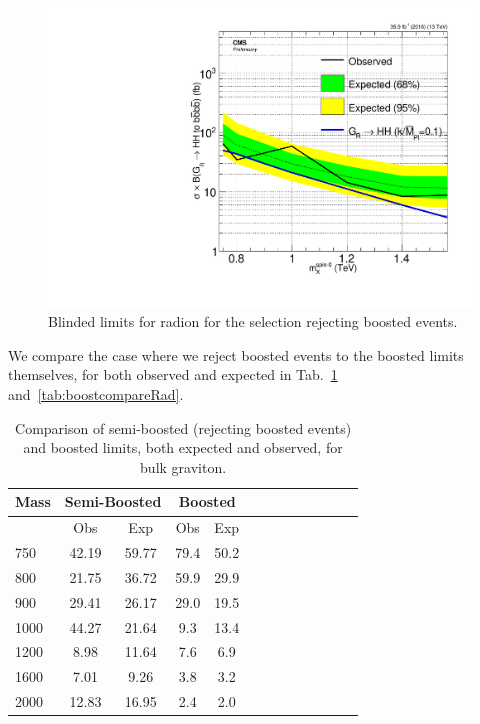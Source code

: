 \begin{figure}[thb!]
\begin{center}
\includegraphics[scale=0.5]{F5/brazilianFlag_Rad_2p1boost_HH4b2p1_HH4b2p1_13TeV.pdf}
\end{center}
\caption{Blinded limits for radion for the selection rejecting boosted events.}
\label{fig:radblindboost}
\end{figure} 

We compare the case where we reject boosted events to the boosted limits themselves, for both observed and expected in Tab.~\ref{tab:boostcompareBG} and~\ref{tab:boostcompareRad}.

\begin{table}[h]
\begin{tabular}{|l|c|c|c|c|c|c|c|c|c|c|c|c|}
\hline
Mass & \multicolumn{2}{c}{Semi-Boosted} & \multicolumn{2}{c}{Boosted}\\ \hline \hline
& Obs & Exp & Obs & Exp\\ \hline
750 & 42.19 & 59.77 & 79.4 & 50.2\\
800 & 21.75 & 36.72 & 59.9 & 29.9\\
900 & 29.41 & 26.17 & 29.0 & 19.5\\ 
1000 & 44.27 & 21.64 &9.3 & 13.4\\
1200 & 8.98 & 11.64 & 7.6 & 6.9\\
1600 & 7.01 & 9.26 & 3.8 & 3.2\\
2000 &  12.83 & 16.95 & 2.4 & 2.0\\
\hline
\end{tabular}
\caption{Comparison of semi-boosted (rejecting boosted events) and boosted limits, both expected and observed, for bulk graviton.}
\label{tab:boostcompareBG}
\end{table}

